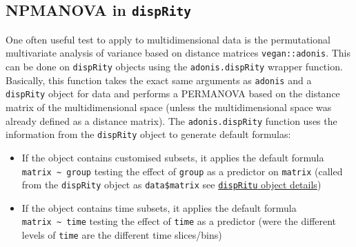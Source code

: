 \documentclass[]{book}
\providecommand{\tightlist}{%
  \setlength{\itemsep}{0pt}\setlength{\parskip}{0pt}}
\theoremstyle{definition}
\theoremstyle{definition}
\theoremstyle{remark}
\begin{document}
\subsection{\texorpdfstring{NPMANOVA in
\texttt{dispRity}}{NPMANOVA in dispRity}}\label{npmanova-in-disprity}

One often useful test to apply to multidimensional data is the
permutational multivariate analysis of variance based on distance
matrices \texttt{vegan::adonis}. This can be done on \texttt{dispRity}
objects using the \texttt{adonis.dispRity} wrapper function. Basically,
this function takes the exact same arguments as \texttt{adonis} and a
\texttt{dispRity} object for data and performs a PERMANOVA based on the
distance matrix of the multidimensional space (unless the
multidimensional space was already defined as a distance matrix). The
\texttt{adonis.dispRity} function uses the information from the
\texttt{dispRity} object to generate default formulas:

\begin{itemize}
\tightlist
\item
  If the object contains customised subsets, it applies the default
  formula \texttt{matrix\ \textasciitilde{}~group} testing the effect of
  \texttt{group} as a predictor on \texttt{matrix} (called from the
  \texttt{dispRity} object as \texttt{data\$matrix} see
  \protect\hyperlink{The-dispRity-object-content}{\texttt{dispRitu}
  object details})
\item
  If the object contains time subsets, it applies the default formula
  \texttt{matrix\ \textasciitilde{}\ time} testing the effect of
  \texttt{time} as a predictor (were the different levels of
  \texttt{time} are the different time slices/bins)
\end{itemize}
\end{document}
